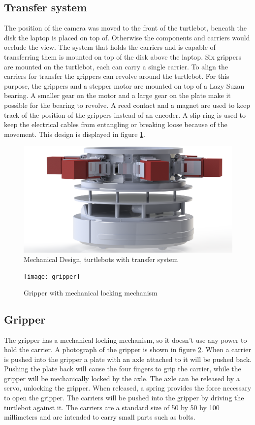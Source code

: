 \documentclass[10pt, journal]{IEEEtran}
\begin{document}
\subsection{Transfer system}
The position of the camera was moved to the front of the turtlebot, beneath the disk the laptop is placed on top of. Otherwise the components and carriers would occlude the view. The system that holds the carriers and is capable of transferring them is mounted on top of the disk above the laptop. Six grippers are mounted on the turtlebot, each can carry a single carrier. To align the carriers for transfer the grippers can revolve around the turtlebot. For this purpose, the grippers and a stepper motor are mounted on top of a Lazy Suzan bearing. A smaller gear on the motor and a large gear on the plate make it possible for the bearing to revolve. A reed contact and a magnet are used to keep track of the position of the grippers instead of an encoder. A slip ring is used to keep the electrical cables from entangling or breaking loose because of the movement. This design is displayed in figure \ref{MechanicalDesign}.
\begin{figure}[htp]
\centering
\includegraphics[width=\columnwidth]{turtle_design}
\caption{Mechanical Design, turtlebots with transfer system}
\label{MechanicalDesign}
\end{figure}
\begin{figure}[htp]
\centering
\texttt{[image: gripper]}
\caption{Gripper with mechanical locking mechanism}
\label{Gripper}
\end{figure}

\subsection{Gripper}
The gripper has a mechanical locking mechanism, so it doesn’t use any power to hold the carrier. A photograph of the gripper is shown in figure \ref{Gripper}. When a carrier is pushed into the gripper a plate with an axle attached to it will be pushed back. Pushing the plate back will cause the four fingers to grip the carrier, while the gripper will be mechanically locked by the axle. The axle can be released by a servo, unlocking the gripper. When released, a spring provides the force necessary to open the gripper. The carriers will be pushed into the gripper by driving the turtlebot against it. 
The carriers are a standard size of 50 by 50 by 100 millimeters and are intended to carry small parts such as bolts. 
\end{document}
